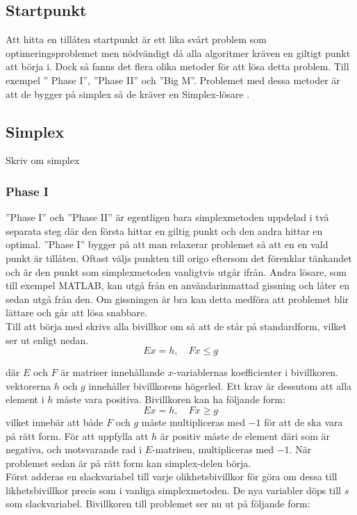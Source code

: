 \subsection{Startpunkt}
Att hitta en tillåten startpunkt är ett lika svårt problem som optimeringsproblemet men nödvändigt då alla algoritmer kräven en giltigt punkt att börja i. Dock så fanns det flera olika metoder för att lösa detta problem. Till exempel '' Phase I'', ''Phase II'' och ''Big M''. Problemet med dessa metoder är att de bygger på simplex så de kräver en Simplex-lösare \citep{numericaloptimization}.

\subsection{Simplex}
Skriv om simplex

\subsubsection{Phase I}
''Phase I'' och ''Phase II'' är egentligen bara simplexmetoden uppdelad i två separata steg där den första hittar en giltig punkt och den andra hittar en optimal. ''Phase I'' bygger på att man relaxerar problemet så att en en vald punkt är tillåten. Oftast väljs punkten till origo eftersom det förenklar tänkandet och är den punkt som simplexmetoden vanligtvis utgår ifrån. Andra lösare, som till exempel MATLAB, kan utgå från en användarinmattad gissning och låter en sedan utgå från den\citep{quadprog}. Om gissningen är bra kan detta medföra att problemet blir lättare och går att lösa snabbare. \\
Till att börja med skrivs alla bivillkor om så att de står på standardform, vilket ser ut enligt nedan.
$$Ex = h, \quad Fx \leq g$$
\raggedright där $E$ och $F$ är matriser innehållande $x$-variablernas koefficienter i bivillkoren. vektorerna $h$ och $g$ innehåller bivillkorens högerled. Ett krav är dessutom att alla element i $h$ måste vara positiva.
Bivillkoren kan ha följande form:
$$Ex = h, \quad Fx \geq g$$
vilket innebär att både $F$ och $g$ måste multipliceras med $-1$ för att de ska vara på rätt form. För att uppfylla att $h$ är positiv måste de element däri som är negativa, och motsvarande rad i $E$-matrisen, multipliceras med $-1$.
När problemet sedan är på rätt form kan simplex-delen börja. \\
Först adderas en slackvariabel till varje olikhetsbivillkor för göra om dessa till likhetsbivillkor precis som i vanliga simplexmetoden. De nya variabler döps till $s$ som slackvariabel. Bivillkoren till problemet ser nu ut på följande form:
